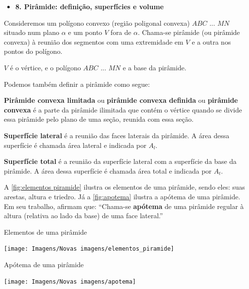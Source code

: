 \begin{itemize}
    \item \textbf{8. Pirâmide: definição, superfícies e volume}
\end{itemize}

Consideremos um polígono convexo (região poligonal convexa) $ABC$ ... $MN$ situado num plano $\alpha$ e um ponto $V$ fora de $\alpha$. Chama-se pirâmide (ou pirâmide convexa) à reunião dos segmentos com uma extremidade em $V$ e a outra nos pontos do polígono.

$V$ é o vértice, e o polígono $ABC$ ... $MN$ e a base da pirâmide.

Podemos também definir a pirâmide como segue:

\textbf{Pirâmide convexa limitada} ou \textbf{pirâmide convexa definida} ou \textbf{pirâmide convexa} é a parte da pirâmide ilimitada que contém o vértice quando se divide essa pirâmide pelo plano de uma seção, reunida com essa seção.

\textbf{Superfície lateral} é a reunião das faces laterais da pirâmide. A área dessa superfície é chamada área lateral e indicada por $A_l$.

\textbf{Superfície total} é a reunião da superfície lateral com a superfície da base da pirâmide. A área dessa superfície é chamada área total e indicada por $A_t$.

A \autoref{fig:elementos piramide} ilustra os elementos de uma pirâmide, sendo eles: suas arestas, altura e triedro. Já a \autoref{fig:apotema} ilustra a apótema de uma pirâmide. Em seu trabalho,  afirmam que: ``Chama-se \textbf{apótema} de uma pirâmide regular à altura (relativa ao lado da base) de uma face lateral.''

\begin{CenteredFigure}
    \caption{Elementos de uma pirâmide} \label{fig:elementos piramide}
    \texttt{[image: Imagens/Novas imagens/elementos\_piramide]}
\end{CenteredFigure}

\begin{CenteredFigure}
    \caption{Apótema de uma pirâmide} \label{fig:apotema}
    \texttt{[image: Imagens/Novas imagens/apotema]}
\end{CenteredFigure}

